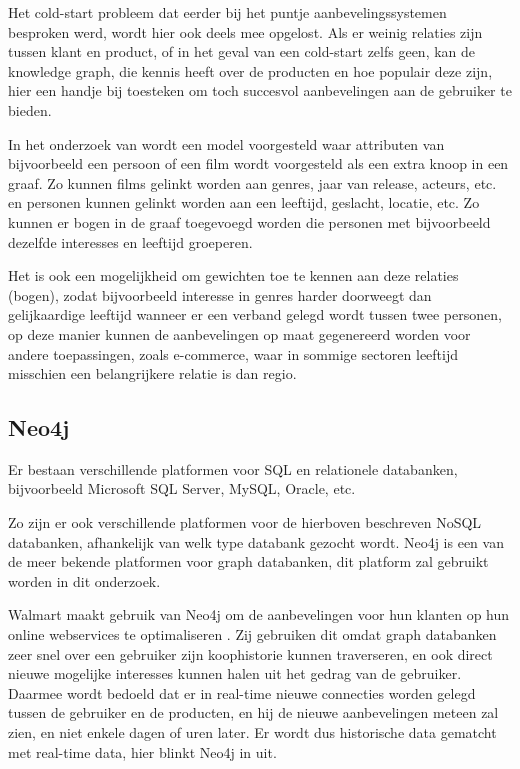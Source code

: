 Het cold-start probleem dat eerder bij het puntje aanbevelingssystemen besproken werd, wordt hier ook deels mee opgelost. Als er weinig relaties zijn tussen klant en product, of in het geval van een cold-start zelfs geen, kan de knowledge graph, die kennis heeft over de producten en hoe populair deze zijn, hier een handje bij toesteken om toch succesvol aanbevelingen aan de gebruiker te bieden.

In het onderzoek van \cite{Grad-Gyenge2015} wordt een model voorgesteld waar attributen van bijvoorbeeld een persoon of een film wordt voorgesteld als een extra knoop in een graaf. Zo kunnen films gelinkt worden aan genres, jaar van release, acteurs, etc. en personen kunnen gelinkt worden aan een leeftijd, geslacht, locatie, etc.
Zo kunnen er bogen in de graaf toegevoegd worden die personen met bijvoorbeeld dezelfde interesses en leeftijd groeperen. 

Het is ook een mogelijkheid om gewichten toe te kennen aan deze relaties (bogen), zodat bijvoorbeeld interesse in genres harder doorweegt dan gelijkaardige leeftijd wanneer er een verband gelegd wordt tussen twee personen, op deze manier kunnen de aanbevelingen op maat gegenereerd worden voor andere toepassingen, zoals e-commerce, waar in sommige sectoren leeftijd misschien een belangrijkere relatie is dan regio.

\newpage

\subsection{Neo4j}
\label{sec:Neo4j}

Er bestaan verschillende platformen voor SQL en relationele databanken, bijvoorbeeld Microsoft SQL Server, MySQL, Oracle, etc.
  
Zo zijn er ook verschillende platformen voor de hierboven beschreven NoSQL databanken, afhankelijk van welk type databank gezocht wordt. Neo4j is een van de meer bekende platformen voor graph databanken, dit platform zal gebruikt worden in dit onderzoek.

Walmart maakt gebruik van Neo4j om de aanbevelingen voor hun klanten op hun online webservices te optimaliseren \autocite{neo4jWalmart2014}. Zij gebruiken dit omdat graph databanken zeer snel over een gebruiker zijn koophistorie kunnen traverseren, en ook direct nieuwe mogelijke interesses kunnen halen uit het gedrag van de gebruiker. Daarmee wordt bedoeld dat er in real-time nieuwe connecties worden gelegd tussen de gebruiker en de producten, en hij de nieuwe aanbevelingen meteen zal zien, en niet enkele dagen of uren later. Er wordt dus historische data gematcht met real-time data, hier blinkt Neo4j in uit. 

